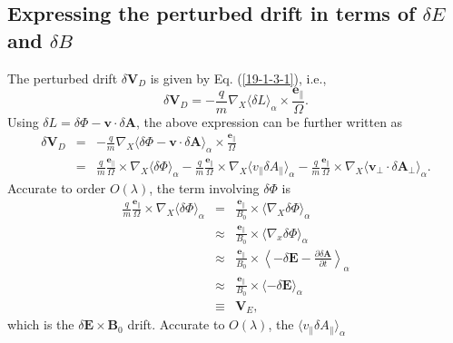\documentclass{article}
\begin{document}
\subsection{Expressing the perturbed drift in terms of $\delta E$ and $\delta
B$}\label{16-10-13-1}

The perturbed drift $\delta \mathbf{V}_D$ is given by Eq. (\ref{19-1-3-1}),
i.e.,
\begin{equation}
  \delta \mathbf{V}_D = - \frac{q}{m} \nabla_X \langle \delta L
  \rangle_{\alpha} \times \frac{\mathbf{e}_{\parallel}}{\Omega} .
\end{equation}
Using $\delta L = \delta \Phi -\mathbf{v} \cdot \delta \mathbf{A}$, the above
expression can be further written as
\begin{eqnarray}
  \delta \mathbf{V}_D & = & - \frac{q}{m} \nabla_X \langle \delta \Phi
  -\mathbf{v} \cdot \delta \mathbf{A} \rangle_{\alpha} \times
  \frac{\mathbf{e}_{\parallel}}{\Omega} \nonumber\\
  & = & \frac{q}{m}  \frac{\mathbf{e}_{\parallel}}{\Omega} \times \nabla_X
  \langle \delta \Phi \rangle_{\alpha} - \frac{q}{m} 
  \frac{\mathbf{e}_{\parallel}}{\Omega} \times \nabla_X \langle v_{\parallel}
  \delta A_{\parallel} \rangle_{\alpha} - \frac{q}{m} 
  \frac{\mathbf{e}_{\parallel}}{\Omega} \times \nabla_X \langle
  \mathbf{v}_{\perp} \cdot \delta \mathbf{A}_{\perp} \rangle_{\alpha} . 
  \label{18-9-14-p1}
\end{eqnarray}
Accurate to order $O (\lambda)$, the term involving $\delta \Phi$ is
\begin{eqnarray}
  \frac{q}{m}  \frac{\mathbf{e}_{\parallel}}{\Omega} \times \nabla_X \langle
  \delta \Phi \rangle_{\alpha} & = &  \frac{\mathbf{e}_{\parallel}}{B_0}
  \times \langle \nabla_X \delta \Phi \rangle_{\alpha} \nonumber\\
  & \approx &  \frac{\mathbf{e}_{\parallel}}{B_0} \times \langle \nabla_x
  \delta \Phi \rangle_{\alpha} \nonumber\\
  & \approx &  \frac{\mathbf{e}_{\parallel}}{B_0} \times \left\langle -
  \delta \mathbf{E}- \frac{\partial \delta \mathbf{A}}{\partial t}
  \right\rangle_{\alpha} \nonumber\\
  & \approx &  \frac{\mathbf{e}_{\parallel}}{B_0} \times \langle - \delta
  \mathbf{E} \rangle_{\alpha} \nonumber\\
  & \equiv & \mathbf{V}_E,  \label{17-5-7-1}
\end{eqnarray}
which is the $\delta \mathbf{E} \times \mathbf{B}_0$ drift. Accurate to $O
(\lambda)$, the $\langle v_{\parallel} \delta A_{\parallel} \rangle_{\alpha}$
\end{document}
